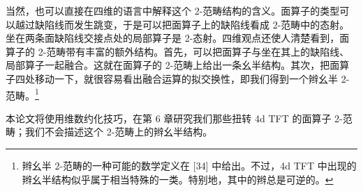 
当然，也可以直接在四维的语言中解释这个 2-范畴结构的含义。面算子的类型可以越过缺陷线而发生跳变，于是可以把面算子上的缺陷线看成 2-范畴中的态射。坐在两条面缺陷线交接点处的局部算子是 2-态射。四维观点还使人清楚看到，面算子的 2-范畴带有丰富的额外结构。首先，可以把面算子与坐在其上的缺陷线、局部算子一起融合。这就在面算子的 2-范畴上给出一条幺半结构。其次，把面算子四处移动一下，就很容易看出融合运算的拟交换性，即我们得到一个辫幺半 2-范畴。\footnote{辫幺半 2-范畴的一种可能的数学定义在 [34] 中给出。不过，4d TFT 中出现的辫幺半结构似乎属于相当特殊的一类。特别地，其中的辫总是可逆的。}


本论文将使用维数约化技巧，在第 6 章研究我们那些扭转 4d TFT 的面算子 2-范畴；我们不会描述这个 2-范畴上的辫幺半结构。
